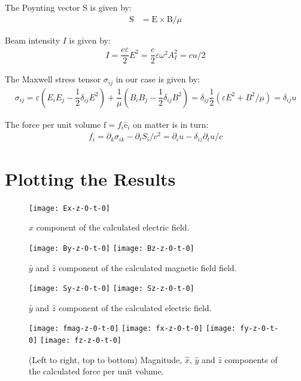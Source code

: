 \documentclass[10pt]{article}
\newcommand{\f}[2]{\dfrac{#1}{#2}} %
\newcommand{\p}[1]{\left(#1\right)} %
\renewcommand{\epsilon}{\varepsilon} %
\renewcommand{\v}[1]{\boldsymbol{\mathrm{#1}}} %
\newcommand{\uv}[1]{\hat{\boldsymbol{\mathrm{#1}}}} %
\renewcommand{\d}{\partial} %
\begin{document}
The Poynting vector $\v S$ is given by:
\begin{align*}
  \v S&=\v E\times\v B/\mu
\end{align*}

Beam intensity $I$ is given by:
\begin{align*}
  I=\f{c\epsilon}2E^2=\f c2\epsilon\omega^2A_I^2=cu/2
\end{align*}

The Maxwell stress tensor $\sigma_{ij}$ in our case is given by:
\begin{align*}
  \sigma_{ij}=\epsilon\p{E_iE_j-\f12\delta_{ij}E^2}
  +\f1\mu\p{B_iB_j-\f12\delta_{ij}B^2} =\delta_{ij}\f12\p{\epsilon
    E^2+B^2/\mu}=\delta_{ij}u
\end{align*}

The force per unit volume $\v f=f_i\uv e_i$ on matter is in turn:
\begin{align*}
  f_i=\d_k\sigma_{ik}-\d_tS_i/c^2=\d_iu-\delta_{iz}\d_tu/c
\end{align*}





\section*{Plotting the Results}

\begin{figure}[h]
\centering
\texttt{[image: Ex-z-0-t-0]}
\caption{$\hat{x}$ component of the calculated electric field.}
\label{g:Ex}
\end{figure}


\begin{figure}[h]
\centering
\texttt{[image: By-z-0-t-0]}
\texttt{[image: Bz-z-0-t-0]}
\caption{$\hat{y}$ and $\hat{z}$  component of the calculated magnetic field field.}
\label{g:By}
\end{figure}









\begin{figure}[h]
\centering
\texttt{[image: Sy-z-0-t-0]}
\texttt{[image: Sz-z-0-t-0]}
\caption{$\hat{y}$ and $\hat{z}$ component of the calculated electric field.}
\label{g:Sy}
\end{figure}


\begin{figure}[h]
\centering
\texttt{[image: fmag-z-0-t-0]}
\texttt{[image: fx-z-0-t-0]}
\texttt{[image: fy-z-0-t-0]}
\texttt{[image: fz-z-0-t-0]}
\caption{(Left to right, top to bottom) Magnitude, $\hat{x}$, $\hat{y}$ and $\hat{z}$ components of the calculated force per unit volume.}
\label{g:F}
\end{figure}
\end{document}
